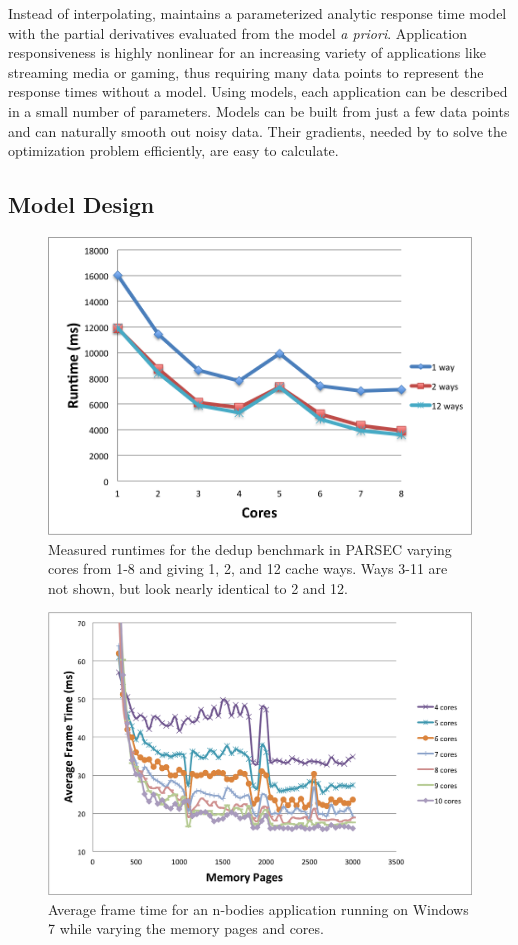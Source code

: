 Instead of interpolating, \pacora maintains a parameterized analytic response time model with the partial derivatives evaluated from the model \emph{a priori}. Application responsiveness is highly nonlinear for an increasing variety of applications like streaming media or gaming, thus requiring many data points to represent the response times without a model. Using models, each application can be described in a small number of parameters.  Models can be built from just a few data points and can naturally smooth out noisy data. Their gradients, needed by \pacora to solve the optimization problem efficiently, are easy to calculate.

\subsection{Model Design}

\begin{figure}[h]
\center
\includegraphics*[width=.80\columnwidth]{Figures/dedup_5hp.png}
\caption{\label{dedup_outlier_fig} Measured runtimes for the dedup benchmark in PARSEC varying cores from 1-8 and giving 1, 2, and 12 cache ways. Ways 3-11 are not shown, but look nearly identical to 2 and 12.}
\end{figure}

\begin{figure}[h]
\center
\includegraphics*[width=.80\columnwidth]{Figures/mem_page_data.png}
\caption{\label{mem_page_fig} Average frame time for an n-bodies application running on Windows 7 while varying the memory pages and cores.}
\end{figure}


